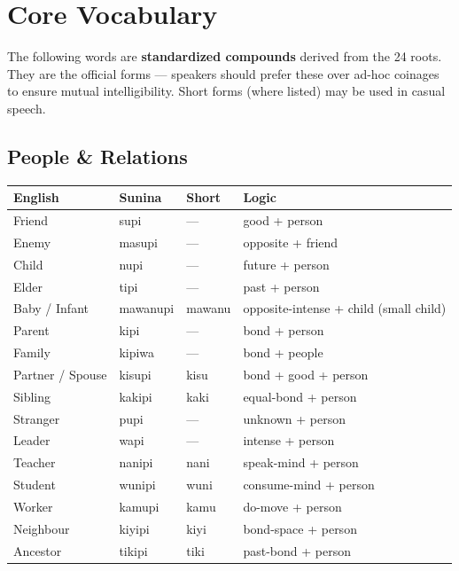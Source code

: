 \documentclass[12pt, a4paper]{article}
\begin{document}
\newpage

\section{Core Vocabulary}
The following words are \textbf{standardized compounds} derived from the 24 roots. They are the official forms --- speakers should prefer these over ad-hoc coinages to ensure mutual intelligibility. Short forms (where listed) may be used in casual speech.

\subsection{People \& Relations}
\begin{tabular}{@{}llll@{}}
\toprule
\textbf{English} & \textbf{Sunina} & \textbf{Short} & \textbf{Logic} \\ \midrule
Friend & supi & --- & good + person \\
Enemy & masupi & --- & opposite + friend \\
Child & nupi & --- & future + person \\
Elder & tipi & --- & past + person \\
Baby / Infant & mawanupi & mawanu & opposite-intense + child (small child) \\
Parent & kipi & --- & bond + person \\
Family & kipiwa & --- & bond + people \\
Partner / Spouse & kisupi & kisu & bond + good + person \\
Sibling & kakipi & kaki & equal-bond + person \\
Stranger & pupi & --- & unknown + person \\
Leader & wapi & --- & intense + person \\
Teacher & nanipi & nani & speak-mind + person \\
Student & wunipi & wuni & consume-mind + person \\
Worker & kamupi & kamu & do-move + person \\
Neighbour & kiyipi & kiyi & bond-space + person \\
Ancestor & tikipi & tiki & past-bond + person \\
\bottomrule
\end{tabular}
\end{document}

